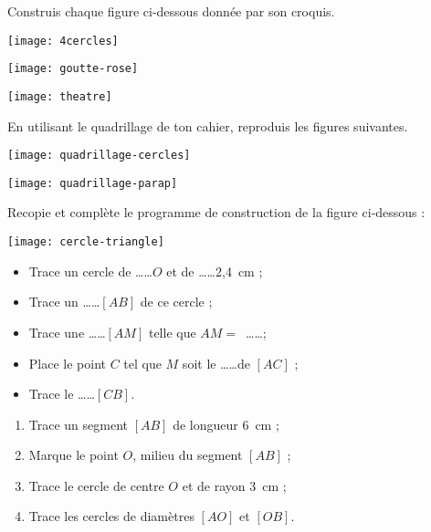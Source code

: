 \begin{exercice}
Construis chaque figure ci-dessous donnée par son croquis.
\begin{colenumerate}{2}
 \item
 
 \texttt{[image: 4cercles]}
 \item
 
\texttt{[image: goutte-rose]}
 \item
 
\texttt{[image: theatre]}
 \end{colenumerate}
\end{exercice}


\begin{exercice}
En utilisant le quadrillage de ton cahier, reproduis les figures suivantes.
\begin{colenumerate}{2}
 \item
 
 \texttt{[image: quadrillage-cercles]}
 \item
 
\texttt{[image: quadrillage-parap]}

 \end{colenumerate}
\end{exercice}


\begin{exercice}
Recopie et complète le programme de construction de la figure ci‑dessous :
\begin{center}  \texttt{[image: cercle-triangle]} \end{center}
\begin{itemize}
 \item Trace un cercle de \ldots \ldots $O$ et de \ldots \ldots 2,4 cm ;
 \item Trace un \ldots \ldots $[AB]$ de ce cercle ;
 \item Trace une \ldots \ldots $[AM]$ telle que $AM =$ \ldots \ldots ;
 \item Place le point $C$ tel que $M$ soit le \ldots \ldots de $[AC]$ ;
 \item Trace le \ldots \ldots $[CB]$.
 \end{itemize}
\end{exercice}


\begin{exercice}[À construire]
\begin{enumerate}
 \item Trace un segment $[AB]$ de longueur 6 cm ;
 \item Marque le point $O$, milieu du segment $[AB]$ ;
 \item Trace le cercle de centre $O$ et de rayon 3 cm ;
 \item Trace les cercles de diamètres $[AO]$ et $[OB]$.
 \end{enumerate}
\end{exercice}


